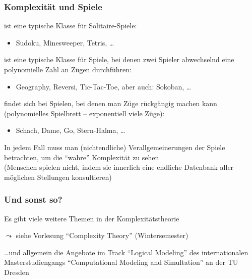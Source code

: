 \documentclass[aspectratio=1610,onlymath]{beamer}
\begin{document}
\begin{frame}\frametitle{Komplexität und Spiele}

\alert{\NP} ist eine typische Klasse für Solitaire-Spiele:
\begin{itemize}
\item Sudoku, Minesweeper, Tetris, \ldots
\end{itemize}
\bigskip\pause

\alert{\PSpace} ist eine typische Klasse für Spiele, bei denen zwei Spieler
abwechselnd eine polynomielle Zahl an Zügen durchführen:
\begin{itemize}
\item Geography, Reversi, Tic-Tac-Toe, aber auch: Sokoban, \ldots
\end{itemize}
\bigskip\pause

\alert{\ExpTime} findet sich bei Spielen, bei denen man Züge rückgängig machen kann (polynomielles Spielbrett -- exponentiell viele Züge):
\begin{itemize}
\item Schach, Dame, Go, Stern-Halma, \ldots
\end{itemize}
\smallskip

In jedem Fall muss man (nichtendliche) Verallgemeinerungen der Spiele betrachten,
um die "`wahre"' Komplexität zu sehen\\ {\tiny(Menschen spielen nicht, indem sie
innerlich eine endliche Datenbank aller möglichen Stellungen konsultieren)}
\smallskip\pause



\end{frame}

\begin{frame}\frametitle{Und sonst so?}

Es gibt viele weitere Themen in der Komplexitätstheorie
\bigskip

$\leadsto$ siehe Vorlesung "`Complexity Theory"' (Wintersemester)
\bigskip

\ldots und allgemein die Angebote im Track \alert{"`Logical Modeling"'} des
internationalen Masterstudiengangs \alert{"`Computational Modeling and Simultation"'} an der TU Dresden

\end{frame}
\end{document}

